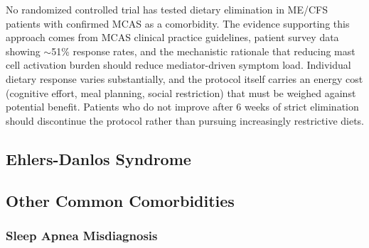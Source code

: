 \begin{limitation}
\label{lim:elimination-no-rct}
No randomized controlled trial has tested dietary elimination in ME/CFS patients with confirmed MCAS as a comorbidity. The evidence supporting this approach comes from MCAS clinical practice guidelines, patient survey data showing $\sim$51\% response rates, and the mechanistic rationale that reducing mast cell activation burden should reduce mediator-driven symptom load. Individual dietary response varies substantially, and the protocol itself carries an energy cost (cognitive effort, meal planning, social restriction) that must be weighed against potential benefit. Patients who do not improve after 6 weeks of strict elimination should discontinue the protocol rather than pursuing increasingly restrictive diets.
\end{limitation}

\subsection{Ehlers-Danlos Syndrome}

\subsection{Other Common Comorbidities}

\subsubsection{Sleep Apnea Misdiagnosis}

